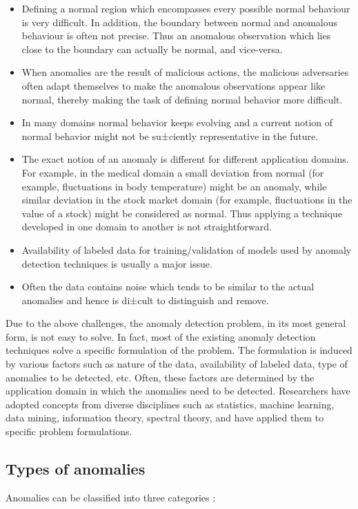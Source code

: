 \begin{itemize}
\item Defining a normal region which encompasses every possible normal behaviour 
is very difficult. In addition, the boundary between normal and anomalous 
behaviour is often not precise. Thus an anomalous observation which lies close
to the boundary can actually be normal, and vice-versa.
\item When anomalies are the result of malicious actions, the malicious 
adversaries often adapt themselves to make the anomalous observations appear 
like normal, thereby making the task of defining normal behavior more difficult.
\item In many domains normal behavior keeps evolving and a current notion of
normal behavior might not be su±ciently representative in the future.
\item The exact notion of an anomaly is different for different application 
domains. For example, in the medical domain a small deviation from normal (for
example, fluctuations in body temperature) might be an anomaly, while similar 
deviation in the stock market domain (for example, fluctuations in the value of 
a stock) might be considered as normal. Thus applying a technique developed in 
one domain to another is not straightforward.
\item Availability of labeled data for training/validation of models used by 
anomaly detection techniques is usually a major issue.
\item Often the data contains noise which tends to be similar to the actual 
anomalies and hence is di±cult to distinguish and remove.
\end{itemize}

Due to the above challenges, the anomaly detection problem, in its most general
form, is not easy to solve. In fact, most of the existing anomaly detection 
techniques solve a specific formulation of the problem. The formulation is 
induced by various factors such as nature of the data, availability of labeled 
data, type of anomalies to be detected, etc. Often, these factors are determined
by the application domain in which the anomalies need to be detected. 
Researchers have adopted concepts from diverse disciplines such as statistics, 
machine learning, data mining, information theory, spectral theory, and have 
applied them to specific problem formulations.

\subsection{Types of anomalies}
\label{sec:typesOfAnomalies}
Anomalies can be classified into three categories \cite{Chandola:2007}:

